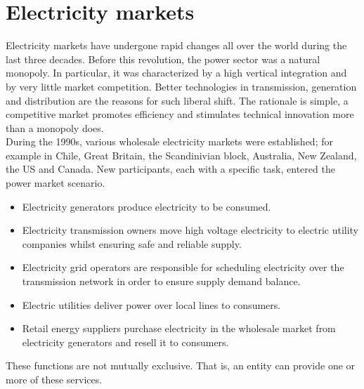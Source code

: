 \section{Electricity markets}
Electricity markets have undergone rapid changes all over the world during the last three decades.
Before this revolution, the power sector was a natural monopoly. In particular, it was characterized by a high vertical integration and by very little market competition. Better technologies in transmission, generation and distribution are the reasons for such liberal shift. The rationale is simple, a competitive market promotes efficiency and stimulates technical innovation more than a monopoly does.
\\
During the 1990s, various wholesale electricity markets were established; for example in Chile, Great Britain, the Scandinivian block, Australia, New Zealand, the US and Canada. New participants, each with a specific task, entered the power market scenario.
\begin{itemize}
    \item Electricity generators produce electricity to be consumed.
    \item Electricity transmission owners 
    move high voltage electricity to electric utility companies whilst ensuring safe and reliable supply.
    \item Electricity grid operators are responsible for scheduling electricity over the transmission network in order to ensure supply demand balance.
    \item Electric utilities deliver power over local lines to consumers. 
    \item Retail energy suppliers purchase electricity in the wholesale market from electricity generators and resell it to consumers.
\end{itemize}
These functions are not mutually exclusive. That is, an entity can provide one or more of these services.



